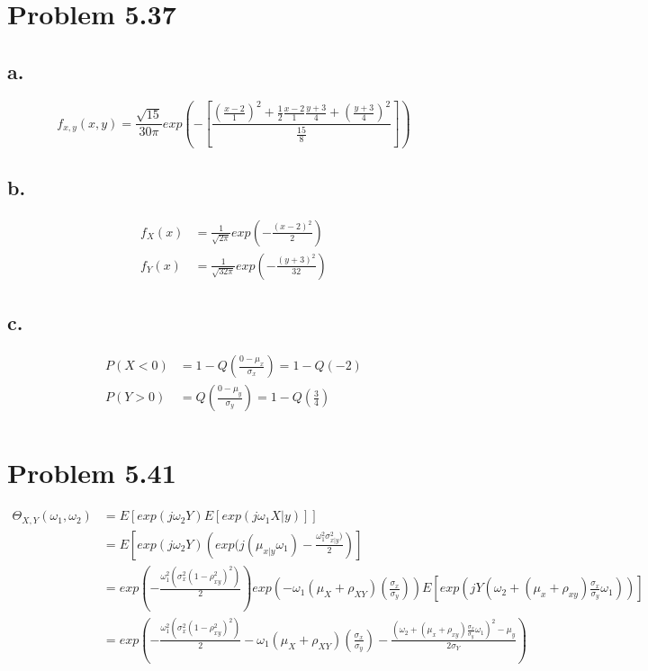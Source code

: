 \documentclass[12pt]{article}
\begin{document}
\section{Problem 5.37}
\subsection{a.}
\[
  f_{x,y}(x,y) = \frac{\sqrt{15}}{30\pi}
  exp\left( -\left[ \frac{(\frac{x-2}{1})^2+\frac{1}{2}\frac{x-2}{1}\frac{y+3}{4} + (\frac{y+3}{4})^2}{\frac{15}{8}} \right] \right)
\]

\subsection{b.}
\begin{align*}
  f_X(x) &= \frac{1}{\sqrt{2\pi}}exp\left( -\frac{(x-2)^2}{2} \right) \\
  f_Y(x) &= \frac{1}{\sqrt{32\pi}}exp\left( -\frac{(y+3)^2}{32} \right)
\end{align*}

\subsection{c.}
\begin{align*}
  P(X<0) &= 1 - Q\left( \frac{0-\mu_x}{\sigma_x} \right) = 1 - Q(-2) \\
  P(Y>0) &= Q\left( \frac{0-\mu_y}{\sigma_y} \right) = 1 - Q\left(\frac{3}{4}\right) \\
\end{align*}

\section{Problem 5.41}
\begin{align*}
  \Theta_{X,Y}(\omega_1,\omega_2) &= E\left[ exp(j\omega_2 Y)E[exp(j\omega_1X|y)] \right] \\
  &= E\left[ exp(j\omega_2 Y)\left( exp(j(\mu_{x|y}\omega_1)-\frac{\omega_1^2\sigma_{x|y}^2)}{2} \right)\right] \\
  &= exp\left( -\frac{\omega_1^2(\sigma_x^2(1-\rho_{xy}^2)^2)}{2} \right)
  exp\left( -\omega_1(\mu_X+\rho_{XY})(\frac{\sigma_x}{\sigma_y}) \right)
  E\left[exp\left( jY(\omega_2+(\mu_x+\rho_{xy})\frac{\sigma_x}{\sigma_y}\omega_1)\right)\right] \\
  &= exp\left( -\frac{\omega_1^2(\sigma_x^2(1-\rho_{xy}^2)^2)}{2} 
  -\omega_1(\mu_X+\rho_{XY})(\frac{\sigma_x}{\sigma_y})
  -\frac{(\omega_2+(\mu_x+\rho_{xy})\frac{\sigma_x}{\sigma_y}\omega_1)^2-\mu_y}{2\sigma_Y}\right) \\
\end{align*}
\end{document}
